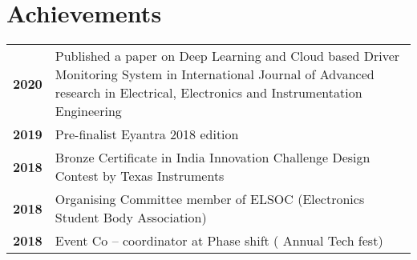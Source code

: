 \documentclass[a4,10pt]{article}
\newenvironment{zitemize}{
\begin{itemize}\itemsep0pt \parskip0pt \parsep1pt}
{\end{itemize}\vspace{-0.5cm}}
\newcommand{\hskills}[1]{
\textbf{\bfseries #1} }
\begin{document}









\section{Achievements}
\vspace{-0.2cm}
\begin{tabular}[t]{ p{4em} p{50em}}
\hskills{2020} & Published a paper on Deep Learning and Cloud based Driver Monitoring System in International Journal of Advanced research in Electrical, Electronics and Instrumentation Engineering \\
\hskills{2019} & Pre-finalist Eyantra 2018 edition \\
\hskills{2018} & Bronze Certificate in India Innovation Challenge Design Contest by Texas Instruments \\
\hskills{2018} & Organising Committee member of ELSOC (Electronics Student Body Association) \\
\hskills{2018} & Event Co – coordinator at Phase shift ( Annual Tech fest) \\
\end{tabular} 

\end{document}
